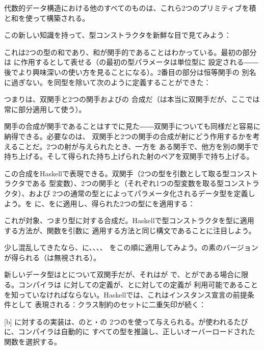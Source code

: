 代数的データ構造における他のすべてのものは、これら2つのプリミティブを積と和を使って構築される。

この新しい知識を持って、型コンストラクタを新鮮な目で見てみよう：

これは2つの型の和であり、和が関手的であることはわかっている。最初の部分は
に作用するとして表せる（の最初の型パラメータは単位型に
設定される――後でより興味深いの使い方を見ることになる）。2番目の部分は恒等関手の
別名に過ぎない。を同型を除いて次のように定義することができた：

つまりは、双関手と2つの関手およびの
合成だ（は本当に双関手だが、ここでは常に部分適用して使う）。

関手の合成が関手であることはすでに見た――双関手についても同様だと容易に納得できる。必要なのは、
双関手と2つの関手の合成が射にどう作用するかを考えることだ。2つの射が与えられたとき、一方を
ある関手で、他方を別の関手で持ち上げる。そして得られた持ち上げられた射のペアを双関手で持ち上げる。

この合成をHaskellで表現できる。双関手（2つの型を引数として取る型コンストラクタである
型変数）、2つの関手と（それぞれ1つの型変数を取る型コンストラクタ）、および
2つの通常の型とによってパラメータ化されるデータ型を定義しよう。を
に、をに適用し、得られた2つの型にを適用する：

これが対象、つまり型に対する合成だ。Haskellで型コンストラクタを型に適用する方法が、関数を引数に
適用する方法と同じ構文であることに注目しよう。

少し混乱してきたなら、に、、、、
をこの順に適用してみよう。の素のバージョンが得られる（は無視される）。

新しいデータ型はとについて双関手だが、それはが
で、とがである場合に限る。コンパイラは
に対しての定義が、とに対しての定義が
利用可能であることを知っていなければならない。Haskellでは、これはインスタンス宣言の前提条件として
表現される：クラス制約のセットに二重矢印が続く：

[b]
に対するの実装は、のと・の
2つのを使って与えられる。が使われるたびに、コンパイラは自動的に
すべての型を推論し、正しいオーバーロードされた関数を選択する。

